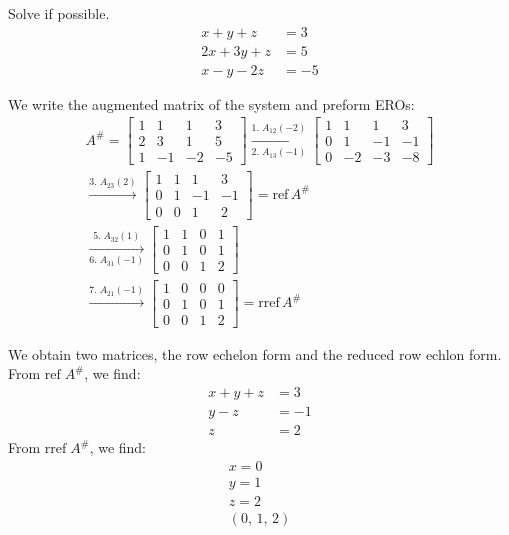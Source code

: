 \documentclass[../main.tex]{subfiles}
\begin{document}
\begin{example}[]
    Solve if possible.
    \begin{align*}
        x + y + z &= 3 \\
        2x + 3y + z &= 5 \\
        x - y -2z &= -5
    \end{align*}

    We write the augmented matrix of the system and preform EROs:
    \begin{gather*}
        A^\# =
        \begin{bmatrix}
            1 & 1 & 1 & 3 \\
            2 & 3 & 1 & 5 \\
            1 & -1 & -2 & -5
        \end{bmatrix}
        \xrightarrow[2. \; A_{13}(-1)]{1. \; A_{12}(-2)}
        \begin{bmatrix}
            1 & 1 & 1 & 3 \\
            0 & 1 & -1 & -1 \\
            0 & -2 & -3 & -8
        \end{bmatrix} \\
        \xrightarrow{3. \; A_{23}(2)}
        \begin{bmatrix}
            1 & 1 & 1 & 3 \\
            0 & 1 & -1 & -1 \\
            0 & 0 & 1 & 2
        \end{bmatrix}
        = \text{ref} \, A^\# \\
        \xrightarrow[6. \; A_{31}(-1)]{5. \; A_{32}(1)}
        \begin{bmatrix}
            1 & 1 & 0 & 1 \\
            0 & 1 & 0 & 1 \\
            0 & 0 & 1 & 2
        \end{bmatrix} \\
        \xrightarrow{7. \; A_{21}(-1)}
        \begin{bmatrix}
            1 & 0 & 0 & 0 \\
            0 & 1 & 0 & 1 \\
            0 & 0 & 1 & 2
        \end{bmatrix}
        = \text{rref} \, A^\#
    \end{gather*}

    We obtain two matrices, the row echelon form and the reduced row echlon form.
    From \( \text{ref} \; A^\# \), we find:
    \begin{align*}
        x + y + z &= 3 \\
        y - z &= -1 \\
        z &= 2
    \end{align*}
    From \( \text{rref} \; A^\# \), we find:
    \begin{gather*}
        x = 0 \\
        y = 1 \\
        z = 2 \\
        \boxed{(0, \, 1, \, 2)}
    \end{gather*}


\end{example}
\end{document}

